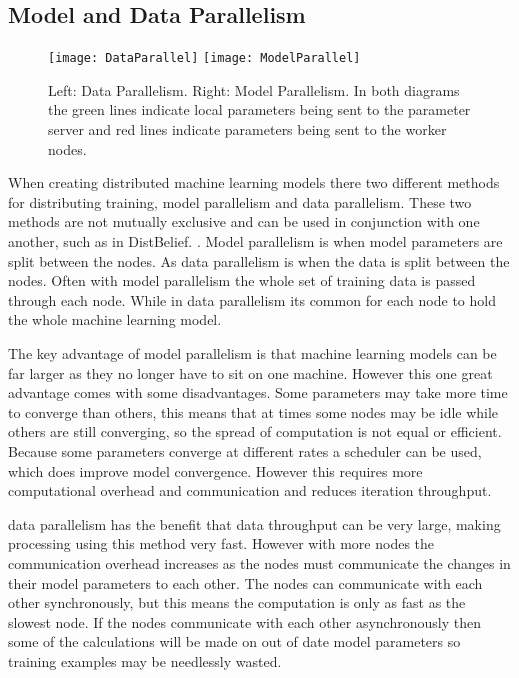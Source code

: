 \subsection{Model and Data Parallelism}
\begin{figure}[h]
    \centering
    \texttt{[image: DataParallel]}
    \texttt{[image: ModelParallel]}
    \caption{Left: Data Parallelism. Right: Model Parallelism. In both diagrams
        the green lines indicate local parameters being sent to the parameter
        server and red lines indicate parameters being sent to the worker nodes.}
\end{figure}
When creating distributed machine learning models there two different methods
for distributing training, model parallelism and data parallelism. These two
methods are not mutually exclusive and can be used in conjunction with one
another, such as in DistBelief. \cite{Dean2012Distbelief}. Model parallelism is
when model parameters are split between the nodes. As data parallelism is when
the data is split between the nodes. \cite{Xing2015Petuum} Often with model
parallelism the whole set of training data is passed through each node. While in
data parallelism its common for each node to hold the whole machine learning
model.

The key advantage of model parallelism is that machine learning models can be
far larger as they no longer have to sit on one machine. However this one great
advantage comes with some disadvantages. Some parameters may take more time to
converge than others, this means that at times some nodes may be idle while
others are still converging, so the spread of computation is not equal or
efficient. \cite{Dean2012Distbelief} Because some parameters converge at
different rates a scheduler can be used, which does improve model convergence.
However this requires more computational overhead and communication and reduces
iteration throughput.
\cite{kim2016STRADS}

data parallelism has the benefit that data throughput can be very large, making
processing using this method very fast. However with more nodes the
communication overhead increases as the nodes must communicate the changes in
their model parameters to each other. \cite{elgabli2020gadmm} The nodes can
communicate with each other synchronously, but this means the computation is
only as fast as the slowest node. If the nodes communicate with each other
asynchronously then some of the calculations will be made on out of date model
parameters so training examples may be needlessly wasted.

